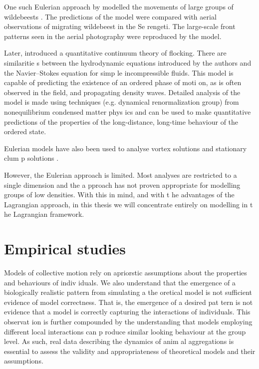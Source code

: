 One such Eulerian approach by \textcite{gueron93} modelled the movements of large groups of wildebeests
. The predictions of the model were compared with aerial observations of migrating wildebeest in the Se
rengeti. The large-scale front patterns seen in the aerial photography were reproduced by the model.

Later, \textcite{toner98} introduced a quantitative continuum theory of flocking. There are similaritie
s between the hydrodynamic equations introduced by the authors and the Navier--Stokes equation for simp
le incompressible fluids. This model is capable of predicting the existence of an ordered phase of moti
on, as is often observed in the field, and propagating density waves. Detailed analysis of the model is
 made using techniques (e.g. dynamical renormalization group) from nonequilibrium condensed matter phys
ics and can be used to make quantitative predictions of the properties of the long-distance, long-time 
behaviour of the ordered state.

Eulerian models have also been used to analyse vortex solutions \parencite{topaz04} and stationary clum
p solutions \parencite{topaz06}.

However, the Eulerian approach is limited. Most analyses are restricted to a single dimension and the a
pproach has not proven appropriate for modelling groups of low densities. With this in mind, and with t
he advantages of the Lagrangian approach, in this thesis we will concentrate entirely on modelling in t
he Lagrangian framework.

\section{Empirical studies}
\label{sec:empirical_studies}

Models of collective motion rely on apriorstic assumptions about the properties and behaviours of indiv
iduals. We also understand that the emergence of a biologically realistic pattern from simulating a the
oretical model is not sufficient evidence of model correctness. That is, the emergence of a desired pat
tern is not evidence that a model is correctly capturing the interactions of individuals. This observat
ion is further compounded by the understanding that models employing different local interactions can p
roduce similar looking behaviour at the group level. As such, real data describing the dynamics of anim
al aggregations is essential to assess the validity and appropriateness of theoretical models and their
 assumptions.

